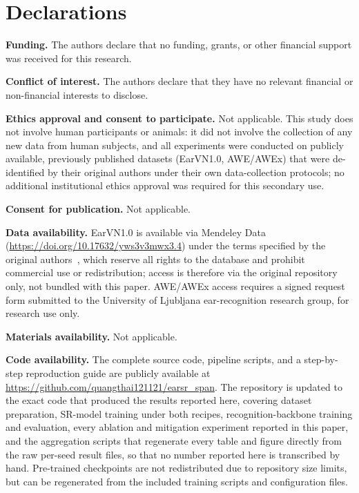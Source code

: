 \documentclass[pdflatex,sn-vancouver-num]{sn-jnl}
\begin{document}
\clearpage
\section*{Declarations}

\begingroup
\setlength{\parskip}{0pt}%
\noindent\textbf{Funding.} \quad The authors declare that no funding, grants, or other financial support was received for this research.
\par\vspace{8pt plus 1pt minus 1pt}%
\noindent\textbf{Conflict of interest.} \quad The authors declare that they have no relevant financial or non-financial interests to disclose.
\par\vspace{8pt plus 1pt minus 1pt}%
\noindent\textbf{Ethics approval and consent to participate.} \quad Not applicable. This study does not involve human participants or animals: it did not involve the collection of any new data from human subjects, and all experiments were conducted on publicly available, previously published datasets (EarVN1.0, AWE/AWEx) that were de-identified by their original authors under their own data-collection protocols; no additional institutional ethics approval was required for this secondary use.
\par\vspace{8pt plus 1pt minus 1pt}%
\noindent\textbf{Consent for publication.} \quad Not applicable.
\par\vspace{8pt plus 1pt minus 1pt}%
\noindent\textbf{Data availability.} \quad EarVN1.0 is available via Mendeley Data (\url{https://doi.org/10.17632/yws3v3mwx3.4}) under the terms specified by the original authors~\cite{hoang2019earvn}, which reserve all rights to the database and prohibit commercial use or redistribution; access is therefore via the original repository only, not bundled with this paper. AWE/AWEx access requires a signed request form submitted to the University of Ljubljana ear-recognition research group, for research use only.
\par\vspace{8pt plus 1pt minus 1pt}%
\noindent\textbf{Materials availability.} \quad Not applicable.
\par\vspace{8pt plus 1pt minus 1pt}%
\noindent\textbf{Code availability.} \quad The complete source code, pipeline scripts, and a step-by-step reproduction guide are publicly available at \url{https://github.com/quangthai121121/earsr_span}. The repository is updated to the exact code that produced the results reported here, covering dataset preparation, SR-model training under both recipes, recognition-backbone training and evaluation, every ablation and mitigation experiment reported in this paper, and the aggregation scripts that regenerate every table and figure directly from the raw per-seed result files, so that no number reported here is transcribed by hand. Pre-trained checkpoints are not redistributed due to repository size limits, but can be regenerated from the included training scripts and configuration files.
\end{document}
